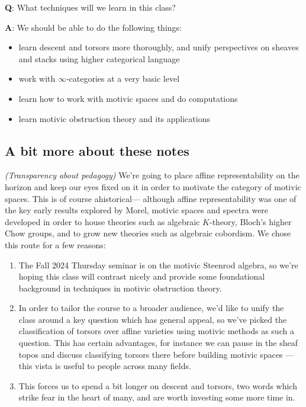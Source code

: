 \documentclass[11pt,openany]{book}
\begin{document}
\textbf{Q}: What techniques will we learn in this class?

\textbf{A}: We should be able to do the following things:
\begin{itemize}
    \item learn descent and torsors more thoroughly, and unify perspectives on sheaves and stacks using higher categorical language
    \item work with $\infty$-categories at a very basic level
    \item learn how to work with motivic spaces and do computations
    \item learn motivic obstruction theory and its applications
\end{itemize}

\subsection{A bit more about these notes}

\begin{remark} \textit{(Transparency about pedagogy)} We're going to place affine representability on the horizon and keep our eyes fixed on it in order to motivate the category of motivic spaces. This is of course ahistorical--- although affine representability was one of the key early results explored by Morel, motivic spaces and spectra were developed in order to house theories such as algebraic $K$-theory, Bloch's higher Chow groups, and to grow new theories such as algebraic cobordism. We chose this route for a few reasons:
\begin{enumerate}
    \item The Fall 2024 Thursday seminar is on the motivic Steenrod algebra, so we're hoping this class will contrast nicely and provide some foundational background in techniques in motivic obstruction theory.
    \item In order to tailor the course to a broader audience, we'd like to unify the class around a key question which has general appeal, so we've picked the classification of torsors over affine varieties using motivic methods as such a question. This has certain advantages, for instance we can pause in the sheaf topos and discuss classifying torsors there before building motivic spaces --- this vista is useful to people across many fields.

    \item This forces us to spend a bit longer on descent and torsors, two words which strike fear in the heart of many, and are worth investing some more time in.
\end{enumerate}
\end{remark}
\end{document}
